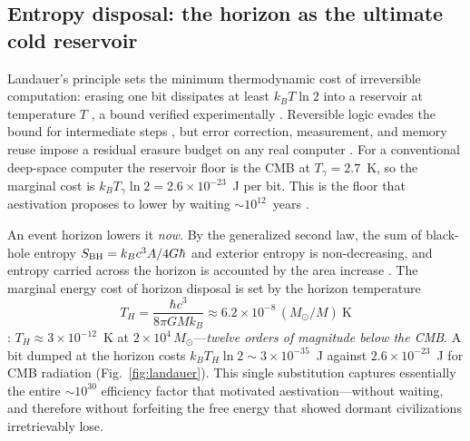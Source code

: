 \documentclass[11pt]{article}
\newcommand{\msun}{M_\odot}
\begin{document}
\subsection{Entropy disposal: the horizon as the ultimate cold reservoir}\label{sec:landauer}
Landauer's principle sets the minimum thermodynamic cost of irreversible computation: erasing one bit dissipates at least $k_B T \ln 2$ into a reservoir at temperature $T$ \citep{landauer1961,bennett1982,parrondo2015}, a bound verified experimentally \citep{berut2012}. Reversible logic evades the bound for intermediate steps \citep{bennett1973,toffoli1980,fredkin1982,athas1994,frank2002b}, but error correction, measurement, and memory reuse impose a residual erasure budget on any real computer \citep{wolpert2019}. For a conventional deep-space computer the reservoir floor is the CMB at $T_\gamma = 2.7$~K, so the marginal cost is $k_B T_\gamma \ln 2 = 2.6\times10^{-23}$~J per bit. This is the floor that aestivation proposes to lower by waiting ${\sim}10^{12}$~years \citep{sandberg2016}.

An event horizon lowers it \emph{now}. By the generalized second law, the sum of black-hole entropy $S_{\rm BH} = k_B c^{3} A/4G\hbar$ and exterior entropy is non-decreasing, and entropy carried across the horizon is accounted by the area increase \citep{bekenstein1973,bekenstein1974,bousso2002}. The marginal energy cost of horizon disposal is set by the horizon temperature
\begin{equation}
T_H = \frac{\hbar c^{3}}{8\pi G M k_B} \approx 6.2\times10^{-8}\,(\msun/M)\ \mathrm{K}
\end{equation}
\citep{hawking1974,hawking1975}: $T_H \approx 3\times10^{-12}$~K at $2\times10^{4}\,\msun$---\emph{twelve orders of magnitude below the CMB}. A bit dumped at the horizon costs $k_B T_H \ln 2 \sim 3\times10^{-35}$~J against $2.6\times10^{-23}$~J for CMB radiation (Fig.~\ref{fig:landauer}). This single substitution captures essentially the entire ${\sim}10^{30}$ efficiency factor that motivated aestivation---without waiting, and therefore without forfeiting the free energy that \citet{bennett2019} showed dormant civilizations irretrievably lose.
\end{document}
